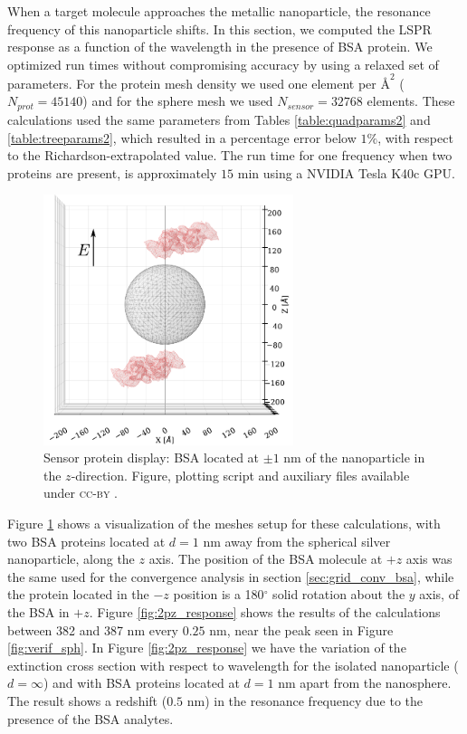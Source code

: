 When a target molecule approaches the metallic nanoparticle, the resonance frequency
of this nanoparticle shifts. In this section, we computed the LSPR response as a
function of the wavelength in the presence of BSA protein. We optimized run times 
without compromising accuracy by using a relaxed set of parameters. For the protein
mesh density we used one element per $\text{\AA}^2$ ($N_{prot} = 45140$) and for the
sphere mesh we used $N_{sensor} = 32768$ elements. These calculations used the same
parameters from Tables \ref{table:quadparams2} and \ref{table:treeparams2}, which 
resulted in a percentage error below $1\%$, with respect to the Richardson-extrapolated
value. The run time for one frequency when two proteins are present, is approximately 
$15$ min using a NVIDIA Tesla K40c GPU.



\begin{center}
    \begin{figure} %
       \centering
       \includegraphics[width=0.65\textwidth]{2prot_1nm_z_R8nm.pdf} 
       \caption{Sensor protein display: BSA located at $\pm 1$ nm of the 
                nanoparticle in the $z$-direction. Figure, plotting script and auxiliary 
                files available under \textsc{cc-by} \cite{ClementiETal2018e}.}
       \label{fig:display_z}
    \end{figure}
    \end{center}

Figure \ref{fig:display_z} shows a visualization of the meshes setup for these 
calculations, with two BSA proteins located at $d=1$ nm away from the spherical 
silver nanoparticle, along the $z$ axis. The position of the BSA molecule at $+z$ 
axis was the same used for the convergence analysis in section \ref{sec:grid_conv_bsa},
while the protein located in the $-z$ position is a 180$^\circ$ solid rotation 
about the $y$ axis, of the BSA in $+z$.  Figure \ref{fig:2pz_response} shows the results
of the calculations between 382 and 387 nm every $0.25$ nm, near the peak seen in Figure
\ref{fig:verif_sph}. In Figure \ref{fig:2pz_response} we have the variation of the 
extinction cross section with respect to wavelength for the isolated nanoparticle 
($d=\infty$) and with BSA proteins located at $d=1$ nm apart from the nanosphere. The
result shows a redshift ($0.5$ nm) in the resonance frequency due to the presence of 
the BSA analytes.

